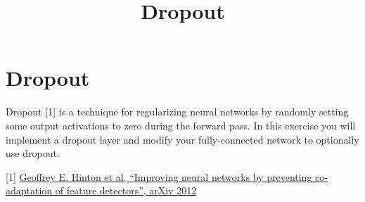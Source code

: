 \documentclass[11pt]{article}
\title{Dropout}
\begin{document}
    
    \maketitle
    
    

    
    \hypertarget{dropout}{%
\section{Dropout}\label{dropout}}

Dropout {[}1{]} is a technique for regularizing neural networks by
randomly setting some output activations to zero during the forward
pass. In this exercise you will implement a dropout layer and modify
your fully-connected network to optionally use dropout.

{[}1{]} \href{https://arxiv.org/abs/1207.0580}{Geoffrey E. Hinton et al,
``Improving neural networks by preventing co-adaptation of feature
detectors'', arXiv 2012}
\end{document}
